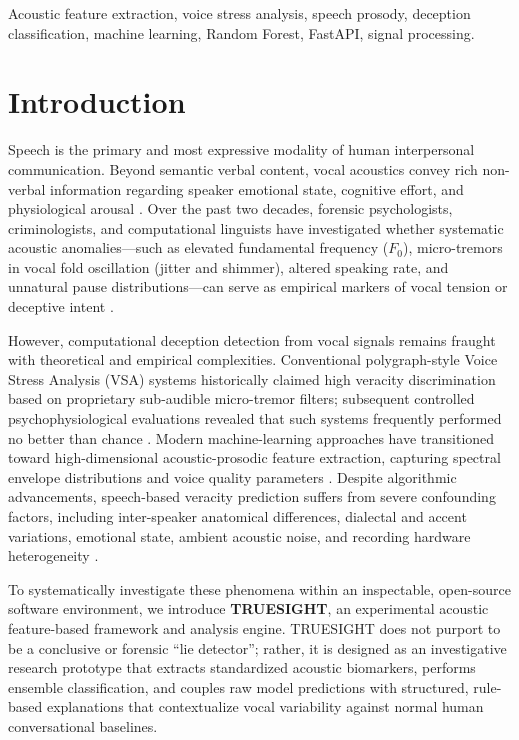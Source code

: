 \documentclass[conference]{IEEEtran}
\begin{document}
\begin{IEEEkeywords}
Acoustic feature extraction, voice stress analysis, speech prosody, deception classification, machine learning, Random Forest, FastAPI, signal processing.
\end{IEEEkeywords}

\section{Introduction}
Speech is the primary and most expressive modality of human interpersonal communication. Beyond semantic verbal content, vocal acoustics convey rich non-verbal information regarding speaker emotional state, cognitive effort, and physiological arousal \cite{hirschberg2005distinguishing}. Over the past two decades, forensic psychologists, criminologists, and computational linguists have investigated whether systematic acoustic anomalies---such as elevated fundamental frequency ($F_0$), micro-tremors in vocal fold oscillation (jitter and shimmer), altered speaking rate, and unnatural pause distributions---can serve as empirical markers of vocal tension or deceptive intent \cite{depaulo2003cues, vrij2019nonverbal}.

However, computational deception detection from vocal signals remains fraught with theoretical and empirical complexities. Conventional polygraph-style Voice Stress Analysis (VSA) systems historically claimed high veracity discrimination based on proprietary sub-audible micro-tremor filters; subsequent controlled psychophysiological evaluations revealed that such systems frequently performed no better than chance \cite{vrij2019nonverbal}. Modern machine-learning approaches have transitioned toward high-dimensional acoustic-prosodic feature extraction, capturing spectral envelope distributions and voice quality parameters \cite{perezrosas2015deception, mendels2017hybrid}. Despite algorithmic advancements, speech-based veracity prediction suffers from severe confounding factors, including inter-speaker anatomical differences, dialectal and accent variations, emotional state, ambient acoustic noise, and recording hardware heterogeneity \cite{levitan2018crosscultural}.

To systematically investigate these phenomena within an inspectable, open-source software environment, we introduce \textbf{TRUESIGHT}, an experimental acoustic feature-based framework and analysis engine. TRUESIGHT does not purport to be a conclusive or forensic ``lie detector''; rather, it is designed as an investigative research prototype that extracts standardized acoustic biomarkers, performs ensemble classification, and couples raw model predictions with structured, rule-based explanations that contextualize vocal variability against normal human conversational baselines.
\end{document}
